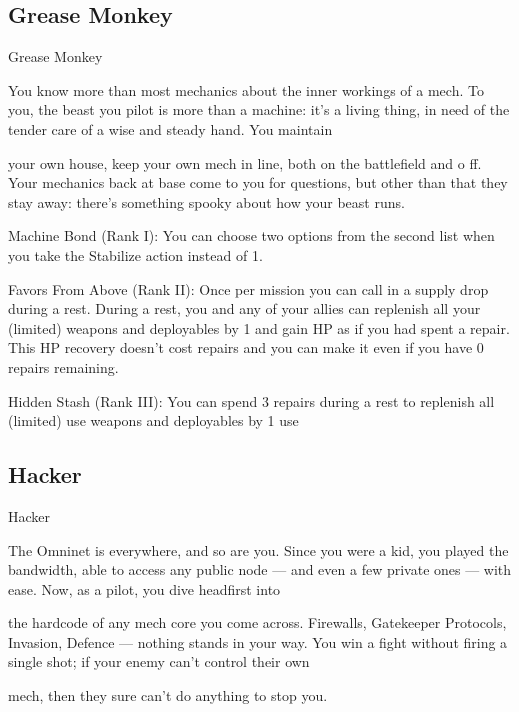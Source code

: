 \subsection{Grease Monkey}

                                              Grease Monkey  

You know more than most mechanics about the inner workings of a mech. To you, the beast you pilot is  
more than a machine: it’s a living thing, in need of the tender care of a wise and steady hand. You maintain  

                                                                                                                  


your own house, keep your own mech in line, both on the battlefield and o ff. Your mechanics back at base  
come to you for questions, but other than that they stay away: there’s something spooky about how your  
beast runs.   

Machine Bond (Rank I): You can choose two options from the second list when you take the  
Stabilize action instead of 1.
 
Favors From Above (Rank II): Once per mission you can call in a supply drop during a rest.  
During a rest, you and any of your allies can replenish all your (limited) weapons and deployables  
by 1 and gain HP as if you had spent a repair. This HP recovery doesn’t cost repairs and you can  
make it even if you have 0 repairs remaining.
 
Hidden Stash (Rank III): You can spend 3 repairs during a rest to replenish all (limited) use  
weapons and deployables by 1 use
 
\subsection{Hacker}

                                                     Hacker  

The Omninet is everywhere, and so are you. Since you were a kid, you played the bandwidth, able to  
access any public node — and even a few private ones — with ease. Now, as a pilot, you dive headfirst into  

the hardcode of any mech core you come across. Firewalls, Gatekeeper Protocols, Invasion, Defence —  
nothing stands in your way. You win a fight without firing a single shot; if your enemy can’t control their own  

mech, then they sure can’t do anything to stop you.   

